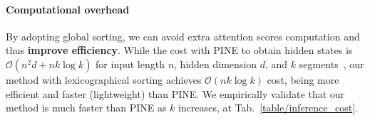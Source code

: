 \paragraph{Computational overhead} By adopting global sorting, we can avoid extra attention scores computation and thus \textbf{improve efficiency}. While the cost with PINE to obtain hidden states is $\mathcal{O}(n^2d + nk\log{k})$ for input length $n$, hidden dimension $d$, and $k$ segments~\citep{pine}, our method with lexicographical sorting achieves $\mathcal{O}(nk\log{k})$ cost, being more efficient and faster (lightweight) than PINE. We empirically validate that our method is much faster than PINE as $k$ increases, at Tab.~\ref{table/inference_cost}.





